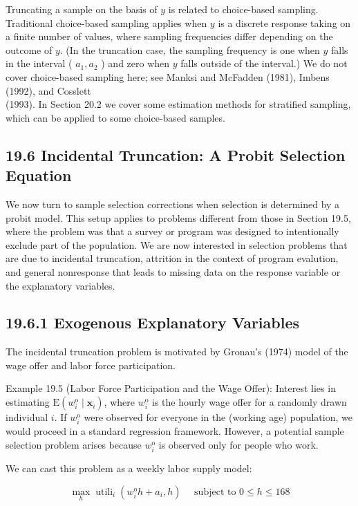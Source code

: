 \documentclass[10pt]{article}
\begin{document}
Truncating a sample on the basis of $y$ is related to choice-based sampling. Traditional choice-based sampling applies when $y$ is a discrete response taking on a finite number of values, where sampling frequencies differ depending on the outcome of $y$. (In the truncation case, the sampling frequency is one when $y$ falls in the interval ( $a_{1}, a_{2}$ ) and zero when $y$ falls outside of the interval.) We do not cover choice-based sampling here; see Manksi and McFadden (1981), Imbens (1992), and Cosslett\\
(1993). In Section 20.2 we cover some estimation methods for stratified sampling, which can be applied to some choice-based samples.

\subsection*{19.6 Incidental Truncation: A Probit Selection Equation}
We now turn to sample selection corrections when selection is determined by a probit model. This setup applies to problems different from those in Section 19.5, where the problem was that a survey or program was designed to intentionally exclude part of the population. We are now interested in selection problems that are due to incidental truncation, attrition in the context of program evalution, and general nonresponse that leads to missing data on the response variable or the explanatory variables.

\subsection*{19.6.1 Exogenous Explanatory Variables}
The incidental truncation problem is motivated by Gronau's (1974) model of the wage offer and labor force participation.

Example 19.5 (Labor Force Participation and the Wage Offer): Interest lies in estimating $\mathrm{E}\left(w_{i}^{\mathrm{o}} \mid \mathbf{x}_{i}\right)$, where $w_{i}^{\mathrm{o}}$ is the hourly wage offer for a randomly drawn individual $i$. If $w_{i}^{\mathrm{o}}$ were observed for everyone in the (working age) population, we would proceed in a standard regression framework. However, a potential sample selection problem arises because $w_{i}^{\mathrm{o}}$ is observed only for people who work.

We can cast this problem as a weekly labor supply model:


\begin{equation*}
\max _{h} \operatorname{utili}_{i}\left(w_{i}^{\mathrm{o}} h+a_{i}, h\right) \quad \text { subject to } 0 \leq h \leq 168 \tag{19.46}
\end{equation*}
\end{document}
